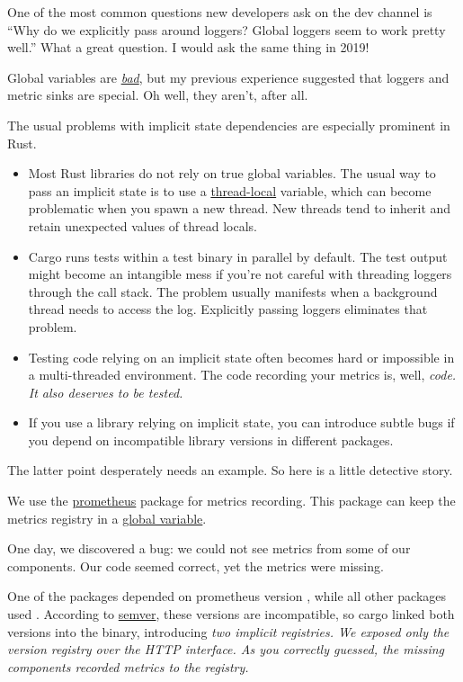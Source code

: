 \documentclass{article}
\begin{document}
One of the most common questions new developers ask on the dev channel is ``Why do we explicitly pass around loggers? Global loggers seem to work pretty well.''
What a great question.
I would ask the same thing in 2019!

Global variables are \href{http://wiki.c2.com/?GlobalVariablesAreBad}{\em{bad}}, but my previous experience suggested that loggers and metric sinks are special.
Oh well, they aren't, after all.

The usual problems with implicit state dependencies are especially prominent in Rust.
\begin{itemize}
\item 
  Most Rust libraries do not rely on true global variables.
  The usual way to pass an implicit state is to use a \href{https://doc.rust-lang.org/stable/std/macro.thread_local.html}{thread-local} variable, which can become problematic when you spawn a new thread.
  New threads tend to inherit and retain unexpected values of thread locals.
\item 
  Cargo runs tests within a test binary in parallel by default.
  The test output might become an intangible mess if you’re not careful with threading loggers through the call stack.
  The problem usually manifests when a background thread needs to access the log.
  Explicitly passing loggers eliminates that problem.
\item 
  Testing code relying on an implicit state often becomes hard or impossible in a multi-threaded environment.
  The code recording your metrics is, well, \em{code}.
  It also deserves to be tested.
\item 
  If you use a library relying on implicit state, you can introduce subtle bugs if you depend on incompatible library versions in different packages.
\end{itemize}

The latter point desperately needs an example.
So here is a little detective story.

We use the \href{https://crates.io/crates/prometheus}{prometheus} package for metrics recording.
This package can keep the metrics registry in a \href{https://docs.rs/prometheus/0.10.0/src/prometheus/registry.rs.html#307-317}{global variable}.

One day, we discovered a bug: we could not see metrics from some of our components.
Our code seemed correct, yet the metrics were missing.

One of the packages depended on prometheus version , while all other packages used .
According to \href{https://semver.org/}{semver}, these versions are incompatible, so cargo linked both versions into the binary, introducing \em{two} implicit registries.
We exposed only the  version registry over the HTTP interface.
As you correctly guessed, the missing components recorded metrics to the  registry.
\end{document}

